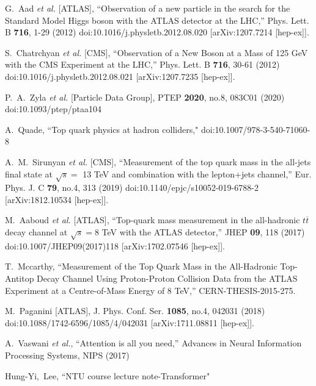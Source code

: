 \begin{thebibliography}{99}

G.~Aad \textit{et al.} [ATLAS],
``Observation of a new particle in the search for the Standard Model Higgs boson with the ATLAS detector at the LHC,''
Phys. Lett. B \textbf{716}, 1-29 (2012)
doi:10.1016/j.physletb.2012.08.020
[arXiv:1207.7214 [hep-ex]].

S.~Chatrchyan \textit{et al.} [CMS],
``Observation of a New Boson at a Mass of 125 GeV with the CMS Experiment at the LHC,''
Phys. Lett. B \textbf{716}, 30-61 (2012)
doi:10.1016/j.physletb.2012.08.021
[arXiv:1207.7235 [hep-ex]].

P.~A.~Zyla \textit{et al.} [Particle Data Group],
PTEP \textbf{2020}, no.8, 083C01 (2020)
doi:10.1093/ptep/ptaa104

A.~Quade,
``Top quark physics at hadron colliders,"
doi:10.1007/978-3-540-71060-8

A.~M.~Sirunyan \textit{et al.} [CMS],
``Measurement of the top quark mass in the all-jets final state at $\sqrt{s} =$ 13 TeV and combination with the lepton+jets channel,''
Eur. Phys. J. C \textbf{79}, no.4, 313 (2019)
doi:10.1140/epjc/s10052-019-6788-2
[arXiv:1812.10534 [hep-ex]].

M.~Aaboud \textit{et al.} [ATLAS],
``Top-quark mass measurement in the all-hadronic $ t\overline{t} $ decay channel at $ \sqrt{s}=8 $ TeV with the ATLAS detector,''
JHEP \textbf{09}, 118 (2017)
doi:10.1007/JHEP09(2017)118
[arXiv:1702.07546 [hep-ex]].

T.~Mccarthy,
``Measurement of the Top Quark Mass in the All-Hadronic Top-Antitop Decay Channel Using Proton-Proton Collision Data from the ATLAS Experiment at a Centre-of-Mass Energy of 8 TeV,''
CERN-THESIS-2015-275.

M.~Paganini [ATLAS],
J. Phys. Conf. Ser. \textbf{1085}, no.4, 042031 (2018)
doi:10.1088/1742-6596/1085/4/042031
[arXiv:1711.08811 [hep-ex]].

A.~Vaswani \textit{et al.},
``Attention is all you need,''
Advances in Neural Information Processing Systems, NIPS (2017)

Hung-Yi,~Lee,
``NTU course lecture note-Transformer"


\end{thebibliography}
\newpage
